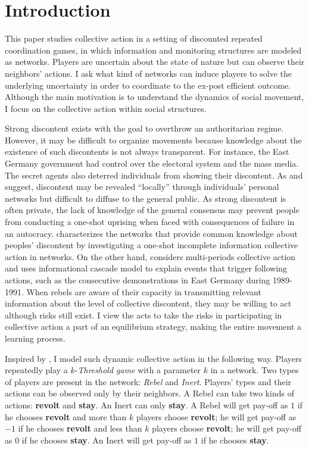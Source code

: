\documentclass[12pt,letterpaper]{article}
\newtheorem*{main result}{Main Result}
\theoremstyle{definition}
\theoremstyle{remark}
\theoremstyle{claim}
\begin{document}
\section{Introduction} 

This paper studies collective action in a setting of discounted repeated coordination games, in which information and monitoring structures are modeled as networks. Players are uncertain about the state of nature but can observe their neighbors' actions. I ask what kind of networks can induce players to solve the underlying uncertainty in order to coordinate to the ex-post efficient outcome. Although the main motivation is to understand the dynamics of social movement, I focus on the collective action within social structures.

Strong discontent exists with the goal to overthrow an authoritarian regime. However, it may be difficult to organize movements because knowledge about the existence of such discontents is not always transparent. For instance, the East Germany government had control over the electoral system and the mass media. The secret agents also deterred individuals from showing their discontent. As \citep{Karl-Dieter1993} and \citep{Chwe2000} suggest, discontent may be revealed ``locally'' through individuals' personal networks but difficult to diffuse to the general public. As strong discontent is often private, the lack of knowledge of the general consensus may prevent people from conducting a one-shot uprising when faced with consequences of failure in an autocracy. \citep{Chwe2000} characterizes the networks that provide common knowledge about peoples' discontent by investigating a one-shot incomplete information collective action in networks. On the other hand, \citep{Lohmann2011} considers multi-periods collective action and uses informational cascade model to explain events that trigger following actions, such as the consecutive demonstrations in East Germany during 1989-1991. When rebels are aware of their capacity in transmitting relevant information about the level of collective discontent, they may be willing to act although risks still exist. I view the acts to take the risks in participating in collective action a part of an equilibrium strategy, making the entire movement a learning process.


Inspired by \citep{Chwe2000}, I model such dynamic collective action in the following way. Players repeatedly play a $k$-\textit{Threshold game} with a parameter $k$ in a network. Two types of players are present in the network: \textit{Rebel} and \textit{Inert}.  Players' types and their actions can be observed only by their neighbors. A Rebel can take two kinds of actions: \textbf{revolt} and \textbf{stay}. An Inert can only \textbf{stay}. A Rebel will get pay-off as $1$ if he chooses \textbf{revolt} and more than $k$ players choose \textbf{revolt}; he will get pay-off as $-1$ if he chooses \textbf{revolt} and less than $k$ players choose \textbf{revolt}; he will get pay-off as $0$ if he chooses \textbf{stay}. An Inert will get pay-off as $1$ if he chooses \textbf{stay}.
\end{document}
